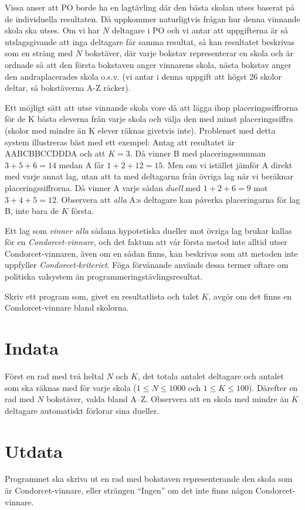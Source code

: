 
Vissa anser att PO borde ha en lagtävling där den bästa skolan utses baserat på de individuella resultaten. Då uppkommer naturligtvis frågan hur denna vinnande skola ska utses.
Om vi har $N$ deltagare i PO och vi antar att uppgifterna är så utslagsgivande att inga deltagare får samma resultat, så kan resultatet beskrivas som en sträng med $N$ bokstäver, där varje bokstav representerar en skola och är ordnade så att den första bokstaven anger vinnarens skola, nästa bokstav anger den andraplacerades skola o.s.v. (vi antar i denna uppgift att högst 26 skolor deltar, så bokstäverna A-Z räcker).

Ett möjligt sätt att utse vinnande skola vore då att lägga ihop placeringssiffrorna för de K bästa eleverna från varje skola och välja den med minst placeringssiffra (skolor med mindre än K elever räknas givetvis inte). Problemet med detta system illustreras bäst med ett exempel: Antag att resultatet är AABCBBCCDDDA
och att $K=3$. Då vinner B med placeringssumman $3+5+6=14$ medan A får $1+2+12=15$. Men om vi istället jämför A direkt med varje annat lag, utan att ta med deltagarna från övriga lag när vi beräknar placeringssiffrorna. Då vinner A varje sådan {\em duell} med $1+2+6=9$ mot $3+4+5=12$. Observera att {\em alla} A:s deltagare kan påverka placeringarna för lag B, inte bara de $K$ första.

Ett lag som {\em vinner alla} sådana hypotetiska dueller mot övriga lag brukar kallas för en {\em Condorcet-vinnare}, och det faktum att vår första metod inte alltid utser Condorcet-vinnaren, även om en sådan finns, kan beskrivas som att metoden inte uppfyller {\em Condorcet-kriteriet}. Föga förvånande används dessa termer oftare om politiska valsystem än programmeringstävlingsresultat.

Skriv ett program som, givet en resultatlista och talet $K$, avgör om det finns en Condorcet-vinnare bland skolorna.

\section*{Indata}

Först en rad med två heltal $N$ och $K$, det totala antalet deltagare och antalet som ska räknas med för varje skola ($1\le N \le 1000$ och $1\le K \le 100$). Därefter en rad med $N$ bokstäver, valda bland A--Z. Observera att en skola med mindre än $K$ deltagare automatiskt förlorar sina dueller.

\section*{Utdata}

Programmet ska skriva ut en rad med bokstaven representerande den skola som är Condorcet-vinnare, eller strängen ``Ingen'' om det inte finns någon Condorcet-vinnare.
